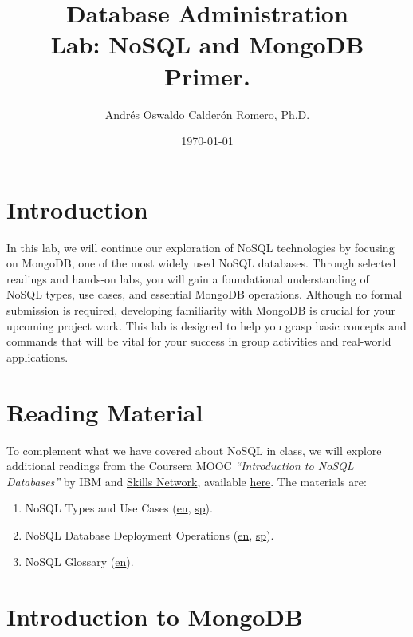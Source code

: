 \documentclass{article}
\title{Database Administration \\ Lab: NoSQL and MongoDB Primer.}
\author{Andrés Oswaldo Calderón Romero, Ph.D.}
\date{\today}
\begin{document}
\maketitle

\section{Introduction}
In this lab, we will continue our exploration of NoSQL technologies by focusing on MongoDB, one of the most widely used NoSQL databases. Through selected readings and hands-on labs, you will gain a foundational understanding of NoSQL types, use cases, and essential MongoDB operations. Although no formal submission is required, developing familiarity with MongoDB is crucial for your upcoming project work. This lab is designed to help you grasp basic concepts and commands that will be vital for your success in group activities and real-world applications.

\section{Reading Material}
To complement what we have covered about NoSQL in class, we will explore additional readings from the Coursera MOOC \textit{``Introduction to NoSQL Databases''} by IBM and \href{https://skills.network/}{Skills Network}, available \href{https://www.coursera.org/learn/introduction-to-nosql-databases}{here}. The materials are:

\begin{enumerate}
    \item NoSQL Types and Use Cases (\href{https://drive.google.com/file/d/1dgG_1JSRWCmeIBABfW83ykd6I1L0tCJJ/view?usp=sharing}{en}, \href{https://drive.google.com/file/d/1rqhSVxo7ci1MEieJIbGGbL3s-qxI1Ltr/view?usp=sharing}{sp}).
    \item NoSQL Database Deployment Operations (\href{https://drive.google.com/file/d/11wvBhvxNRG0HttqZ9p_SgdIaQMlDE9nt/view?usp=sharing}{en}, \href{https://drive.google.com/file/d/1gMjSwO69xOUUbY7pJ_Rs10uJ15oQYUUA/view?usp=sharing}{sp}).
    \item NoSQL Glossary (\href{https://drive.google.com/file/d/1XmvBUvBvYdzN6l4gS-Q6eavlJZm6m4DH/view?usp=sharing}{en}).
\end{enumerate}

\section{Introduction to MongoDB}
\end{document}
